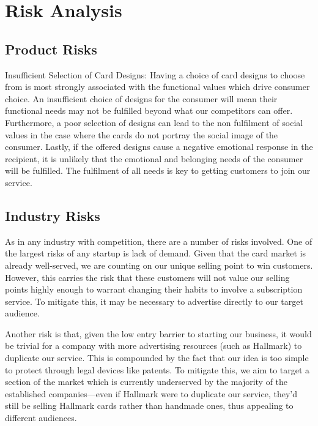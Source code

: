 \documentclass[10pt,a4paper]{article}
\begin{document}
\section*{Risk Analysis}
\subsection*{Product Risks}
Insufficient Selection of Card Designs: Having a choice of card designs to choose from is most strongly associated with the functional values which drive consumer choice. An insufficient choice of designs for the consumer will mean their functional needs may not be fulfilled beyond what our competitors can offer. Furthermore, a poor selection of designs can lead to the non fulfilment of social values in the case where the cards do not portray the social image of the consumer. Lastly, if the offered designs cause a negative emotional response in the recipient, it is unlikely that the emotional and belonging needs of the consumer will be fulfilled. The fulfilment of all needs is key to getting customers to join our service.

\subsection*{Industry Risks}
As in any industry with competition, there are a number of risks involved. One of the largest risks of any startup is lack of demand. Given that the card market is already well-served, we are counting on our unique selling point to win customers. However, this carries the risk that these customers will not value our selling points highly enough to warrant changing their habits to involve a subscription service. To mitigate this, it may be necessary to advertise directly to our target audience.

Another risk is that, given the low entry barrier to starting our business, it would be trivial for a company with more advertising resources (such as Hallmark) to duplicate our service. This is compounded by the fact that our idea is too simple to protect through legal devices like patents. To mitigate this, we aim to target a section of the market which is currently underserved by the majority of the established companies---even if Hallmark were to duplicate our service, they'd still be selling Hallmark cards rather than handmade ones, thus appealing to different audiences.
\end{document}
